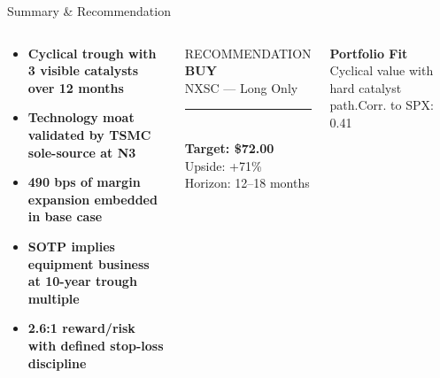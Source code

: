 \documentclass[10pt,aspectratio=169]{beamer}
\begin{document}
\begin{frame}{Summary \& Recommendation}

  \vspace{2pt}
  \begin{columns}[T,onlytextwidth]
      \begin{block}{}
        \begin{itemize}
          \setlength{\itemsep}{3pt}
          \item[\color{gold}\faCheckCircle] {\footnotesize\bfseries Cyclical trough with 3 visible catalysts over 12 months}
          \item[\color{gold}\faCheckCircle] {\footnotesize\bfseries Technology moat validated by TSMC sole-source at N3}
          \item[\color{gold}\faCheckCircle] {\footnotesize\bfseries 490 bps of margin expansion embedded in base case}
          \item[\color{gold}\faCheckCircle] {\footnotesize\bfseries SOTP implies equipment business at 10-year trough multiple}
          \item[\color{gold}\faCheckCircle] {\footnotesize\bfseries 2.6:1 reward/risk with defined stop-loss discipline}
        \end{itemize}
      \end{block}

      \begin{statbox}
        \centering
        {\footnotesize RECOMMENDATION}\\[4pt]
        {\fontsize{18}{22}\bfseries\color{gold}BUY}\\[2pt]
        {\footnotesize NXSC — Long Only}\\[8pt]
        \textcolor{white!60}{\rule{40pt}{0.5pt}}\\[6pt]
        {\normalsize\bfseries Target: \$72.00}\\[1pt]
        {\small Upside: +71\%}\\[1pt]
        {\footnotesize Horizon: 12–18 months}
      \end{statbox}

      \vspace{4pt}
      \begin{calloutbox}
        \centering
        {\footnotesize\bfseries\color{navy}Portfolio Fit}\\[1pt]
        {\scriptsize Cyclical value with hard catalyst path.\quad Corr. to SPX: 0.41}
      \end{calloutbox}
  \end{columns}


\end{frame}
\end{document}

